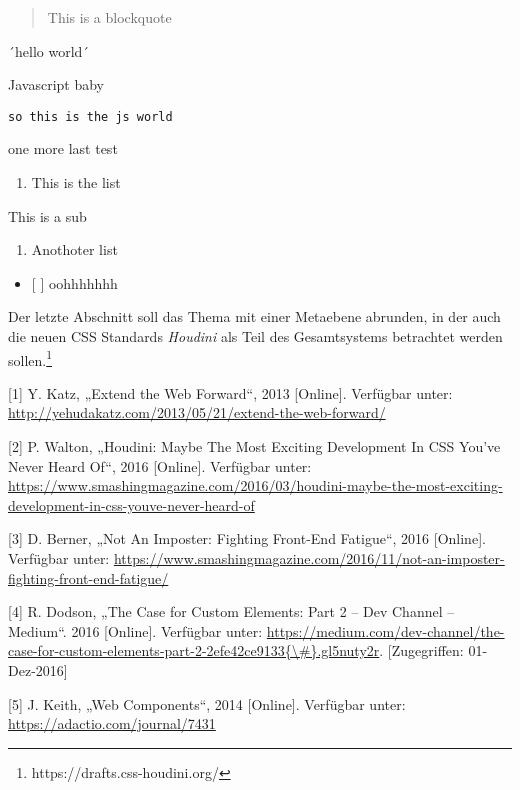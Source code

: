 \documentclass[ngerman,]{../assets/latex/ieee}
\newenvironment{Shaded}{}{}
\newcommand{\NormalTok}[1]{{#1}}
\providecommand{\tightlist}{%
  \setlength{\itemsep}{0pt}\setlength{\parskip}{0pt}}
\begin{document}
\begin{quote}
This is a blockquote
\end{quote}

´hello world´

\begin{Shaded}
\begin{Highlighting}[]
\NormalTok{Javascript baby}
\end{Highlighting}
\end{Shaded}

\texttt{so\ this\ is\ the\ js\ world}

one more last test

\begin{enumerate}
\def\labelenumi{\arabic{enumi}.}
\tightlist
\item
  This is the list
\end{enumerate}

This is a sub

\begin{enumerate}
\def\labelenumi{\arabic{enumi}.}
\setcounter{enumi}{1}
\tightlist
\item
  Anothoter list
\end{enumerate}

\begin{itemize}
\tightlist
\item
  {[} {]} oohhhhhhh
\end{itemize}

Der letzte Abschnitt soll das Thema mit einer Metaebene abrunden, in der
auch die neuen CSS Standards \emph{Houdini} als Teil des Gesamtsystems
betrachtet werden sollen.\footnote{https://drafts.css-houdini.org/}

\hypertarget{refs}{}
\hypertarget{ref-Katz2013}{}
{[}1{]} Y. Katz, „Extend the Web Forward``, 2013 {[}Online{]}. Verfügbar
unter: \url{http://yehudakatz.com/2013/05/21/extend-the-web-forward/}

\hypertarget{ref-Walton2016}{}
{[}2{]} P. Walton, „Houdini: Maybe The Most Exciting Development In CSS
You've Never Heard Of``, 2016 {[}Online{]}. Verfügbar unter:
\url{https://www.smashingmagazine.com/2016/03/houdini-maybe-the-most-exciting-development-in-css-youve-never-heard-of}

\hypertarget{ref-Berner2016}{}
{[}3{]} D. Berner, „Not An Imposter: Fighting Front-End Fatigue``, 2016
{[}Online{]}. Verfügbar unter:
\url{https://www.smashingmagazine.com/2016/11/not-an-imposter-fighting-front-end-fatigue/}

\hypertarget{ref-Dodson2016}{}
{[}4{]} R. Dodson, „The Case for Custom Elements: Part 2 -- Dev Channel
-- Medium``. 2016 {[}Online{]}. Verfügbar unter:
\href{https://medium.com/dev-channel/the-case-for-custom-elements-part-2-2efe42ce9133\%7B/\#\%7D.gl5nuty2r}{https://medium.com/dev-channel/the-case-for-custom-elements-part-2-2efe42ce9133\{\textbackslash{}\#\}.gl5nuty2r}.
{[}Zugegriffen: 01-Dez-2016{]}

\hypertarget{ref-Keith2014}{}
{[}5{]} J. Keith, „Web Components``, 2014 {[}Online{]}. Verfügbar unter:
\url{https://adactio.com/journal/7431}
\end{document}
